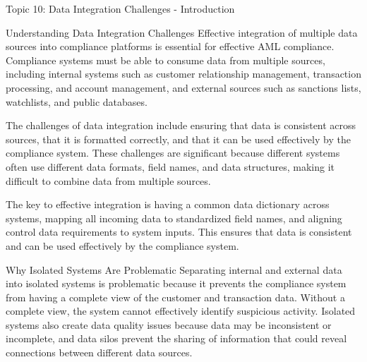 \documentclass[8pt]{beamer}  %
\begin{document}
	\begin{frame}{Topic 10: Data Integration Challenges - Introduction}
		\begin{block}{\large Understanding Data Integration Challenges}
			Effective integration of multiple data sources into compliance platforms is essential for effective AML compliance. Compliance systems must be able to consume data from multiple sources, including internal systems such as customer relationship management, transaction processing, and account management, and external sources such as sanctions lists, watchlists, and public databases.
			
			The challenges of data integration include ensuring that data is consistent across sources, that it is formatted correctly, and that it can be used effectively by the compliance system. These challenges are significant because different systems often use different data formats, field names, and data structures, making it difficult to combine data from multiple sources.
			
			The key to effective integration is having a common data dictionary across systems, mapping all incoming data to standardized field names, and aligning control data requirements to system inputs. This ensures that data is consistent and can be used effectively by the compliance system.
		\end{block}
		
		\vspace{0.2cm}
		\begin{block}{\large Why Isolated Systems Are Problematic}
			Separating internal and external data into isolated systems is problematic because it prevents the compliance system from having a complete view of the customer and transaction data. Without a complete view, the system cannot effectively identify suspicious activity. Isolated systems also create data quality issues because data may be inconsistent or incomplete, and data silos prevent the sharing of information that could reveal connections between different data sources.
		\end{block}
	\end{frame}
	
\end{document}
